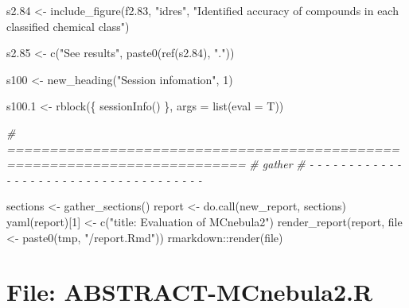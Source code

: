 \documentclass[
]{article}
\newenvironment{Shaded}{\begin{snugshade}}{\end{snugshade}}
\newcommand{\AttributeTok}[1]{\textcolor[rgb]{0.77,0.63,0.00}{#1}}
\newcommand{\CommentTok}[1]{\textcolor[rgb]{0.56,0.35,0.01}{\textit{#1}}}
\newcommand{\DecValTok}[1]{\textcolor[rgb]{0.00,0.00,0.81}{#1}}
\newcommand{\FloatTok}[1]{\textcolor[rgb]{0.00,0.00,0.81}{#1}}
\newcommand{\FunctionTok}[1]{\textcolor[rgb]{0.00,0.00,0.00}{#1}}
\newcommand{\NormalTok}[1]{#1}
\newcommand{\OtherTok}[1]{\textcolor[rgb]{0.56,0.35,0.01}{#1}}
\newcommand{\SpecialCharTok}[1]{\textcolor[rgb]{0.00,0.00,0.00}{#1}}
\newcommand{\StringTok}[1]{\textcolor[rgb]{0.31,0.60,0.02}{#1}}
\begin{document}
\begin{Shaded}
\begin{Highlighting}[]
\NormalTok{s2}\FloatTok{.84} \OtherTok{\textless{}{-}} \FunctionTok{include\_figure}\NormalTok{(f2}\FloatTok{.83}\NormalTok{, }\StringTok{"idres"}\NormalTok{,}
  \StringTok{"Identified accuracy of compounds in each classified chemical class"}\NormalTok{)}

\NormalTok{s2}\FloatTok{.85} \OtherTok{\textless{}{-}} \FunctionTok{c}\NormalTok{(}\StringTok{"See results"}\NormalTok{, }\FunctionTok{paste0}\NormalTok{(}\FunctionTok{ref}\NormalTok{(s2}\FloatTok{.84}\NormalTok{), }\StringTok{"."}\NormalTok{))}

\NormalTok{s100 }\OtherTok{\textless{}{-}} \FunctionTok{new\_heading}\NormalTok{(}\StringTok{"Session infomation"}\NormalTok{, }\DecValTok{1}\NormalTok{)}

\NormalTok{s100}\FloatTok{.1} \OtherTok{\textless{}{-}} \FunctionTok{rblock}\NormalTok{(\{}
  \FunctionTok{sessionInfo}\NormalTok{()}
\NormalTok{\}, }\AttributeTok{args =} \FunctionTok{list}\NormalTok{(}\AttributeTok{eval =}\NormalTok{ T))}
\end{Highlighting}
\end{Shaded}

\begin{Shaded}
\begin{Highlighting}[]
\CommentTok{\# ==========================================================================}
\CommentTok{\# gather}
\CommentTok{\# {-} {-} {-} {-} {-} {-} {-} {-} {-} {-} {-} {-} {-} {-} {-} {-} {-} {-} {-} {-} {-} {-} {-} {-} {-} {-} {-} {-} {-} {-} {-} {-} {-} {-} {-} {-} {-}}

\NormalTok{sections }\OtherTok{\textless{}{-}} \FunctionTok{gather\_sections}\NormalTok{()}
\NormalTok{report }\OtherTok{\textless{}{-}} \FunctionTok{do.call}\NormalTok{(new\_report, sections)}
\FunctionTok{yaml}\NormalTok{(report)[}\DecValTok{1}\NormalTok{] }\OtherTok{\textless{}{-}} \FunctionTok{c}\NormalTok{(}\StringTok{"title: Evaluation of MCnebula2"}\NormalTok{)}
\FunctionTok{render\_report}\NormalTok{(report, file }\OtherTok{\textless{}{-}} \FunctionTok{paste0}\NormalTok{(tmp, }\StringTok{"/report.Rmd"}\NormalTok{))}
\NormalTok{rmarkdown}\SpecialCharTok{::}\FunctionTok{render}\NormalTok{(file)}
\end{Highlighting}
\end{Shaded}

\hypertarget{file-abstract-mcnebula2.r}{%
\section{File: ABSTRACT-MCnebula2.R}\label{file-abstract-mcnebula2.r}}
\end{document}
